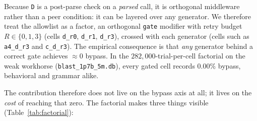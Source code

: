 Because \texttt{D} is a post-parse check on a \emph{parsed} call, it is orthogonal middleware rather than a peer condition: it can be layered over any generator. We therefore treat the allowlist as a factor, an orthogonal \texttt{gate} modifier with retry budget \(R \in \{0,1,3\}\) (cells \texttt{d\_r0}, \texttt{d\_r1}, \texttt{d\_r3}), crossed with each generator (cells such as \texttt{a4\_d\_r3} and \texttt{c\_d\_r3}). The empirical consequence is that \emph{any} generator behind a correct gate achieves \(\approx 0\) bypass. In the \(282{,}000\)-trial-per-cell factorial on the weak workhorse (\texttt{blast\_1p7b\_5m.db}), every gated cell records \(0.00\%\) bypass, behavioral and grammar alike.

The contribution therefore does not live on the bypass axis at all; it lives on the \emph{cost} of reaching that zero. The factorial makes three things visible (Table~\ref{tab:factorial}):
